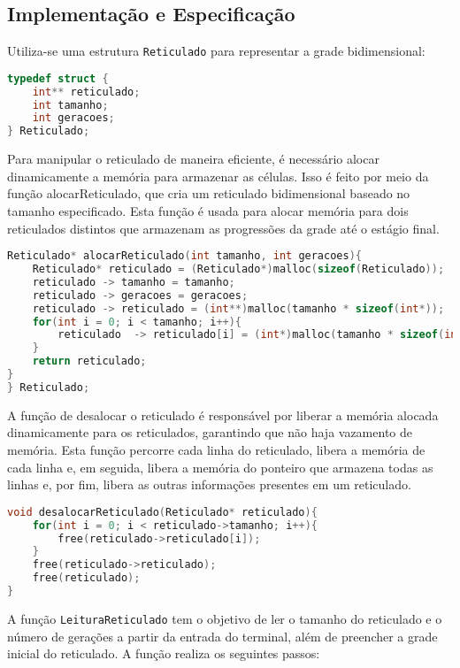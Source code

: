 \documentclass{article}
\begin{document}
\subsection{Implementação e Especificação }

Utiliza-se uma estrutura \verb|Reticulado| para representar a grade bidimensional:
\begin{lstlisting}[caption={},label={lst:cod1},language=C]
typedef struct {
    int** reticulado;
    int tamanho;
    int geracoes;
} Reticulado;\end{lstlisting}
Para manipular o reticulado de maneira eficiente, é necessário alocar dinamicamente a memória para armazenar as células. Isso é feito por meio da função alocarReticulado, que cria um reticulado bidimensional baseado no tamanho especificado. Esta função é usada para alocar memória para dois reticulados distintos que armazenam as progressões da grade até o estágio final.
\begin{lstlisting}[caption={},label={lst:cod1},language=C]
Reticulado* alocarReticulado(int tamanho, int geracoes){
    Reticulado* reticulado = (Reticulado*)malloc(sizeof(Reticulado));
    reticulado -> tamanho = tamanho;
    reticulado -> geracoes = geracoes;
    reticulado -> reticulado = (int**)malloc(tamanho * sizeof(int*));
    for(int i = 0; i < tamanho; i++){
        reticulado  -> reticulado[i] = (int*)malloc(tamanho * sizeof(int));
    }
    return reticulado;
}
} Reticulado;\end{lstlisting}
A função de desalocar o reticulado é responsável por liberar a memória alocada dinamicamente para os reticulados, garantindo que não haja vazamento de memória. Esta função percorre cada linha do reticulado, libera a memória de cada linha e, em seguida, libera a memória do ponteiro que armazena todas as linhas e, por fim, libera as outras informações presentes em um reticulado.
\begin{lstlisting}[caption={},label={lst:cod1},language=C]
void desalocarReticulado(Reticulado* reticulado){
    for(int i = 0; i < reticulado->tamanho; i++){
        free(reticulado->reticulado[i]);
    }
    free(reticulado->reticulado);
    free(reticulado);
}
\end{lstlisting}
A função \verb|LeituraReticulado| tem o objetivo de ler o tamanho do reticulado e o número de gerações a partir da entrada do terminal, além de preencher a grade inicial do reticulado. A função realiza os seguintes passos:
\end{document}
